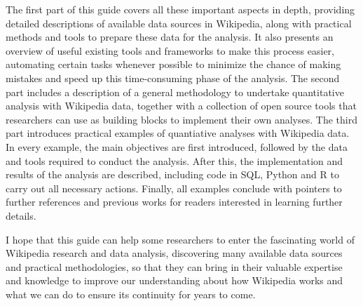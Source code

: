 The first part of this guide covers all these important aspects in depth, providing
detailed descriptions of available data sources in Wikipedia, along with practical
methods and tools to prepare these data for the analysis. It also presents an
overview of useful existing tools and frameworks to make this process easier, automating
certain tasks whenever possible to minimize the chance of making mistakes and speed
up this time-consuming phase of the analysis. The second part 
includes a description of a general methodology to undertake quantitative
analysis with Wikipedia data, together with a collection of open source tools 
that researchers can use as building blocks to implement their own analyses. 
The third part introduces practical examples of quantiative analyses with Wikipedia
data. In every example, the main objectives are first introduced, followed
by the data and tools required to conduct the analysis. After this, the implementation
and results of the analysis are described, including code in SQL, Python and R to
carry out all necessary actions. Finally, all examples conclude with pointers to further
references and previous works for readers interested in learning further details.

I hope that this guide can help some researchers to enter the fascinating world
of Wikipedia research and data analysis, discovering many available data sources
and practical methodologies, so that they can bring in their valuable expertise and
knowledge to improve our understanding about how Wikipedia works and what we can
do to ensure its continuity for years to come.

\linespread{1.2}